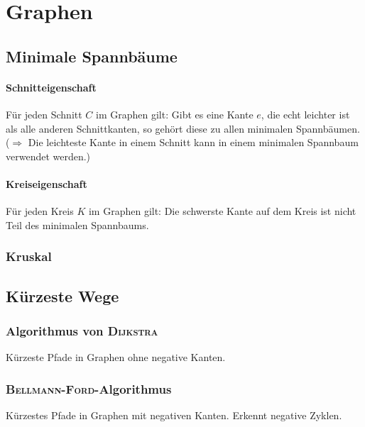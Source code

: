 \section{Graphen}

\subsection{Minimale Spannbäume}

\paragraph{Schnitteigenschaft}
Für jeden Schnitt $C$ im Graphen gilt:
Gibt es eine Kante $e$, die echt leichter ist als alle anderen Schnittkanten, so gehört diese zu allen minimalen Spannbäumen.
($\Rightarrow$ Die leichteste Kante in einem Schnitt kann in einem minimalen Spannbaum verwendet werden.)

\paragraph{Kreiseigenschaft}
Für jeden Kreis $K$ im Graphen gilt:
Die schwerste Kante auf dem Kreis ist nicht Teil des minimalen Spannbaums.

\subsubsection{Kruskal}


\subsection{Kürzeste Wege}

\subsubsection{Algorithmus von \textsc{Dijkstra}}
Kürzeste Pfade in Graphen ohne negative Kanten.


\subsubsection{\textsc{Bellmann-Ford}-Algorithmus}
Kürzestes Pfade in Graphen mit negativen Kanten.
Erkennt negative Zyklen.


